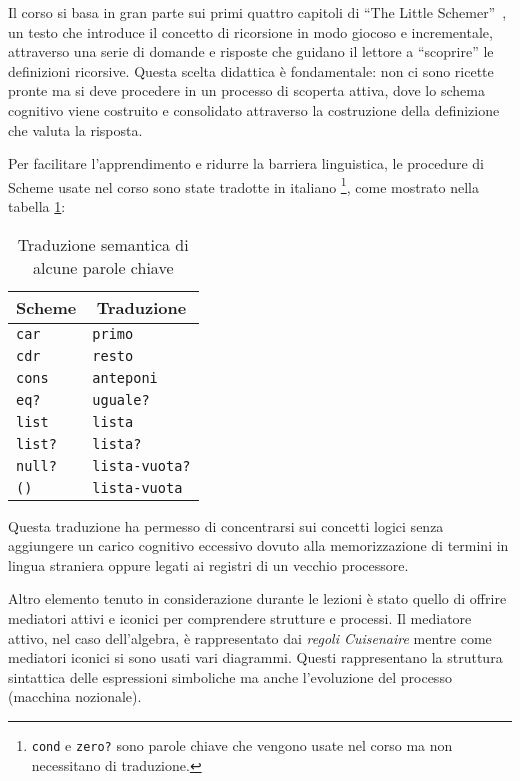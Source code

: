 \documentclass[withtimes]{easychair}
\begin{document}
Il corso si basa in gran parte sui primi quattro capitoli di ``The Little Schemer''~\cite{Friedman1995}, un testo che introduce il concetto di ricorsione in modo giocoso e incrementale, attraverso una serie di domande e risposte che guidano il lettore a ``scoprire'' le definizioni ricorsive. Questa scelta didattica è fondamentale: non ci sono ricette pronte ma si deve procedere in un processo di scoperta attiva, dove lo schema cognitivo viene costruito e consolidato attraverso la costruzione della definizione che valuta la risposta.

Per facilitare l'apprendimento e ridurre la barriera linguistica, le procedure di Scheme usate nel corso sono state tradotte in italiano \footnote{\texttt{cond} e \texttt{zero?} sono parole chiave che vengono usate nel corso ma non necessitano di traduzione.}, come mostrato nella tabella \ref{tbl:traduzioni}:

\begin{table}
  \centering
  \begin{tabular}{ll} \toprule
  \multicolumn{1}{c}{Scheme} & \multicolumn{1}{c}{Traduzione}\\\midrule
  \texttt{car} & \texttt{primo} \\
  \texttt{cdr} & \texttt{resto} \\
  \texttt{cons} & \texttt{anteponi} \\
  \texttt{eq?} & \texttt{uguale?} \\
  \texttt{list} & \texttt{lista} \\
  \texttt{list?} & \texttt{lista?} \\
  \texttt{null?} & \texttt{lista-vuota?} \\
  \texttt{\textquotesingle{}()} & \texttt{lista-vuota} \\\bottomrule
  \end{tabular}
  \caption{Traduzione semantica di alcune parole chiave}\label{tbl:traduzioni}
\end{table}

Questa traduzione ha permesso di concentrarsi sui concetti logici senza aggiungere un carico cognitivo eccessivo dovuto alla memorizzazione di termini in lingua straniera oppure legati ai registri di un vecchio processore.

Altro elemento tenuto in considerazione durante le lezioni è stato quello di offrire mediatori attivi e iconici per comprendere strutture e processi. Il mediatore attivo, nel caso dell'algebra, è rappresentato dai \emph{regoli Cuisenaire} mentre come mediatori iconici si sono usati vari diagrammi. Questi rappresentano la struttura sintattica delle espressioni simboliche ma anche l'evoluzione del processo (macchina nozionale).
\end{document}
